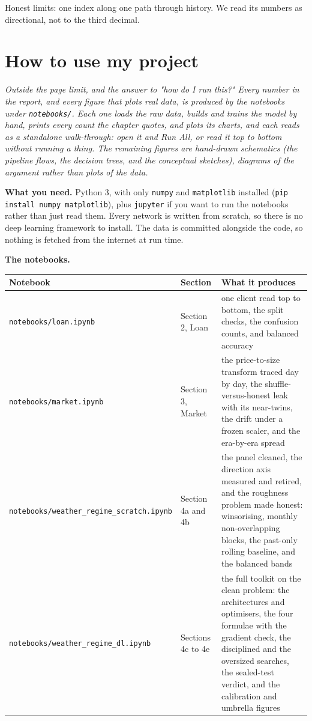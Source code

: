 \documentclass[11pt]{article} %
\begin{document}
Honest limits: one index along one path through history. We read its numbers as directional, not to the third decimal.



\section{How to use my project}


\emph{Outside the page limit, and the answer to "how do I run this?" Every number in the report, and every figure that plots real data, is produced by the notebooks under \texttt{notebooks/}. Each one loads the raw data, builds and trains the model by hand, prints every count the chapter quotes, and plots its charts, and each reads as a standalone walk-through: open it and Run All, or read it top to bottom without running a thing. The remaining figures are hand-drawn schematics (the pipeline flows, the decision trees, and the conceptual sketches), diagrams of the argument rather than plots of the data.}

\textbf{What you need.} Python 3, with only \texttt{numpy} and \texttt{matplotlib} installed (\texttt{pip install numpy matplotlib}), plus \texttt{jupyter} if you want to run the notebooks rather than just read them. Every network is written from scratch, so there is no deep learning framework to install. The data is committed alongside the code, so nothing is fetched from the internet at run time.

\textbf{The notebooks.}

\begin{center}
\begin{tabular}{lll}
\hline
Notebook & Section & What it produces \\
\hline
\texttt{notebooks/loan.ipynb} & Section 2, Loan & one client read top to bottom, the split checks, the confusion counts, and balanced accuracy \\
\texttt{notebooks/market.ipynb} & Section 3, Market & the price-to-size transform traced day by day, the shuffle-versus-honest leak with its near-twins, the drift under a frozen scaler, and the era-by-era spread \\
\texttt{notebooks/weather\_regime\_scratch.ipynb} & Section 4a and 4b & the panel cleaned, the direction axis measured and retired, and the roughness problem made honest: winsorising, monthly non-overlapping blocks, the past-only rolling baseline, and the balanced bands \\
\texttt{notebooks/weather\_regime\_dl.ipynb} & Sections 4c to 4e & the full toolkit on the clean problem: the architectures and optimisers, the four formulae with the gradient check, the disciplined and the oversized searches, the sealed-test verdict, and the calibration and umbrella figures \\
\hline
\end{tabular}
\end{center}
\end{document}
